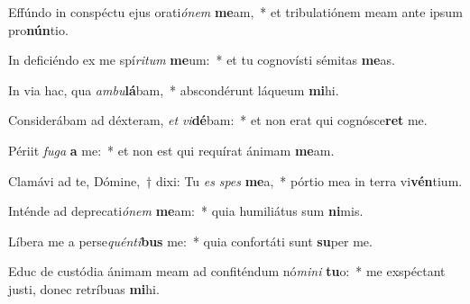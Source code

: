 \item Effúndo in conspéctu ejus orati\textit{ó}\textit{nem} \textbf{me}am,~* et tribulatiónem meam ante ipsum pro\textbf{nún}tio.
\item In deficiéndo ex me spí\textit{ri}\textit{tum} \textbf{me}um:~* et tu cognovísti sémitas \textbf{me}as.
\item In via hac, qua \textit{am}\textit{bu}\textbf{lá}bam,~* abscondérunt láqueum \textbf{mi}hi.
\item Considerábam ad déxteram, \textit{et} \textit{vi}\textbf{dé}bam:~* et non erat qui cognósce\textbf{ret} me.
\item Périit \textit{fu}\textit{ga} \textbf{a} me:~* et non est qui requírat ánimam \textbf{me}am.
\item Clamávi ad te, Dómine,~† dixi: Tu \textit{es} \textit{spes} \textbf{me}a,~* pórtio mea in terra vi\textbf{vén}tium.
\item Inténde ad deprecati\textit{ó}\textit{nem} \textbf{me}am:~* quia humiliátus sum \textbf{ni}mis.
\item Líbera me a perse\textit{quén}\textit{ti}\textbf{bus} me:~* quia confortáti sunt \textbf{su}per me.
\item Educ de custódia ánimam meam ad confiténdum nó\textit{mi}\textit{ni} \textbf{tu}o:~* me exspéctant justi, donec retríbuas \textbf{mi}hi.
